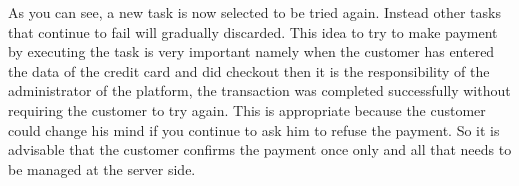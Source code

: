 \begin{itemize}
As you can see, a new task is now selected to be tried again. Instead other tasks that continue to fail will gradually discarded.
\newline
This idea to try to make payment by executing the task is very important namely when the customer has entered the data of the credit card and did checkout then it is the responsibility of the administrator of the platform, the transaction was completed successfully without requiring the customer to try again.
\newline
This is appropriate because the customer could change his mind if you continue to ask him to refuse the payment. So it is advisable that the customer confirms the payment once only and all that needs to be managed at the server side.
\newline
\end{itemize}
